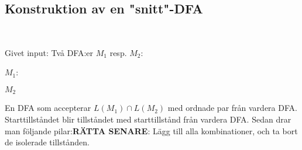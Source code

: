 \subsection{Konstruktion av en "snitt"-DFA}\hfill\\\par
\noindent Givet input: Två DFA:er $M_1$ resp. $M_2$:\par
\noindent $M_1$:
\par
\noindent $M_2$
\par\bigskip
\noindent En DFA som accepterar $L(M_1)\cap L(M_2)$ med ordnade par från vardera DFA. Starttillståndet blir tillståndet med starttillstånd från vardera DFA. Sedan drar man följande pilar:\textbf{RÄTTA SENARE}: Lägg till alla kombinationer, och ta bort de isolerade tillstånden. 
